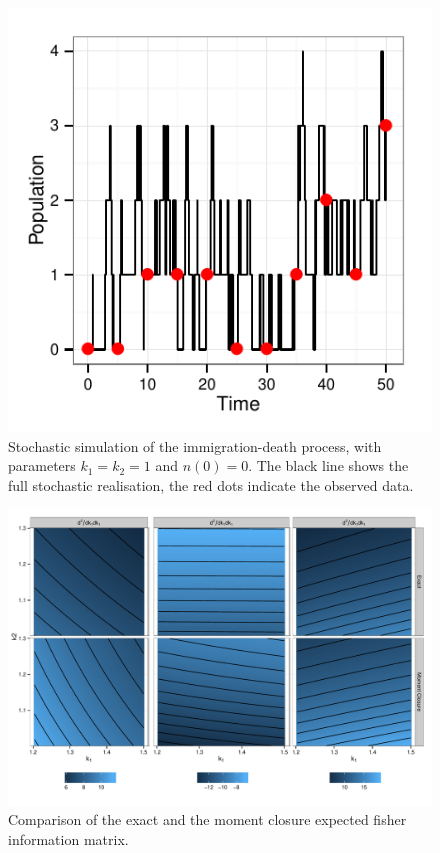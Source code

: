 \documentclass{pnastwo}
\begin{document}
\begin{figure}[ht]
\begin{center}
\centerline{\includegraphics[]{../graphics/figure1}}
\end{center}
\caption{Stochastic simulation of the immigration-death process, with parameters
$k_1=k_2=1$ and $n(0)=0$. The black line shows the full stochastic realisation, 
the red dots indicate the observed data.}\label{F1}
\end{figure}
\begin{figure}[ht]
\begin{center}
\centerline{\includegraphics[width=.7\textwidth]{../graphics/figure2}}
\caption{Comparison of the exact and the moment closure expected fisher information matrix. }
\label{F2}
\end{center}
\end{figure}
% 
\end{document}
